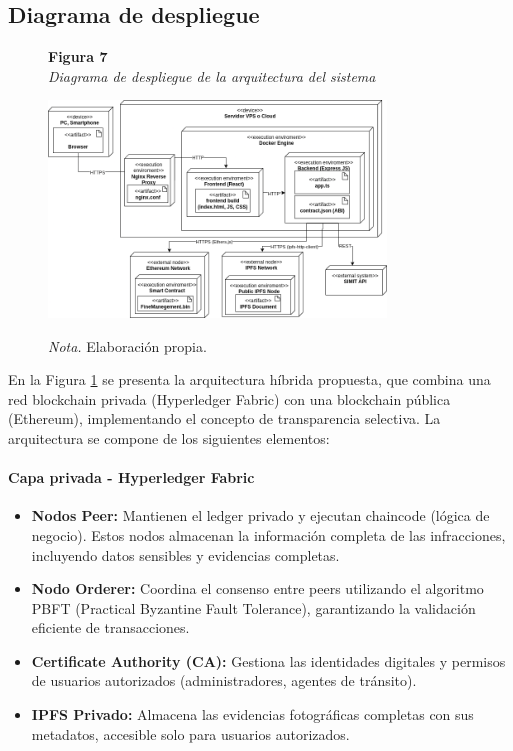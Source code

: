 \subsection{Diagrama de despliegue}
\begin{figure}[htbp]
    \begin{flushleft}
        \textbf{Figura 7}\\[2em]
        \textit{Diagrama de despliegue de la arquitectura del sistema}
    \end{flushleft}
    \vspace{1em}
    \centering
    \includegraphics[width=0.8\textwidth]{Images/Despliegue.png}
    \vspace{2em}
    \begin{flushleft}
        \textit{Nota.} Elaboración propia.
    \end{flushleft}
    \label{fig:diagrama_despliegue}
\end{figure}

En la Figura \ref{fig:diagrama_despliegue} se presenta la arquitectura híbrida propuesta, que combina una red blockchain privada (Hyperledger Fabric) con una blockchain pública (Ethereum), implementando el concepto de transparencia selectiva. La arquitectura se compone de los siguientes elementos:

\paragraph{Capa privada - Hyperledger Fabric}
\begin{itemize}
    \item \textbf{Nodos Peer:} Mantienen el ledger privado y ejecutan chaincode (lógica de negocio). Estos nodos almacenan la información completa de las infracciones, incluyendo datos sensibles y evidencias completas.
    \item \textbf{Nodo Orderer:} Coordina el consenso entre peers utilizando el algoritmo PBFT (Practical Byzantine Fault Tolerance), garantizando la validación eficiente de transacciones.
    \item \textbf{Certificate Authority (CA):} Gestiona las identidades digitales y permisos de usuarios autorizados (administradores, agentes de tránsito).
    \item \textbf{IPFS Privado:} Almacena las evidencias fotográficas completas con sus metadatos, accesible solo para usuarios autorizados.
\end{itemize}

